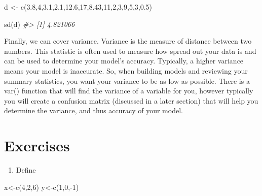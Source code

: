 \documentclass[
]{book}
\newenvironment{Shaded}{\begin{snugshade}}{\end{snugshade}}
\newcommand{\CommentTok}[1]{\textcolor[rgb]{0.56,0.35,0.01}{\textit{#1}}}
\newcommand{\DecValTok}[1]{\textcolor[rgb]{0.00,0.00,0.81}{#1}}
\newcommand{\FloatTok}[1]{\textcolor[rgb]{0.00,0.00,0.81}{#1}}
\newcommand{\FunctionTok}[1]{\textcolor[rgb]{0.00,0.00,0.00}{#1}}
\newcommand{\NormalTok}[1]{#1}
\newcommand{\OtherTok}[1]{\textcolor[rgb]{0.56,0.35,0.01}{#1}}
\newcommand{\SpecialCharTok}[1]{\textcolor[rgb]{0.00,0.00,0.00}{#1}}
\providecommand{\tightlist}{%
  \setlength{\itemsep}{0pt}\setlength{\parskip}{0pt}}
\begin{document}
\begin{Shaded}
\begin{Highlighting}[]
\NormalTok{d }\OtherTok{\textless{}{-}} \FunctionTok{c}\NormalTok{(}\FloatTok{3.8}\NormalTok{,}\DecValTok{4}\NormalTok{,}\FloatTok{3.1}\NormalTok{,}\FloatTok{2.1}\NormalTok{,}\FloatTok{12.6}\NormalTok{,}\DecValTok{17}\NormalTok{,}\FloatTok{8.43}\NormalTok{,}\DecValTok{11}\NormalTok{,}\DecValTok{2}\NormalTok{,}\DecValTok{3}\NormalTok{,}\DecValTok{9}\NormalTok{,}\DecValTok{5}\NormalTok{,}\DecValTok{3}\NormalTok{,}\FloatTok{0.5}\NormalTok{)}

\FunctionTok{sd}\NormalTok{(d)}
\CommentTok{\#\textgreater{} [1] 4.821066}
\end{Highlighting}
\end{Shaded}

Finally, we can cover variance. Variance is the measure of distance between two numbers. This statistic is often used to measure how spread out your data is and can be used to determine your model's accuracy. Typically, a higher variance means your model is inaccurate. So, when building models and reviewing your summary statistics, you want your variance to be as low as possible. There is a var() function that will find the variance of a variable for you, however typically you will create a confusion matrix (discussed in a later section) that will help you determine the variance, and thus accuracy of your model.

\hypertarget{exercises-1}{%
\section{Exercises}\label{exercises-1}}

\begin{enumerate}
\def\labelenumi{\arabic{enumi}.}
\tightlist
\item
  Define
\end{enumerate}

\begin{Shaded}
\begin{Highlighting}[]
\NormalTok{x}\OtherTok{\textless{}{-}}\FunctionTok{c}\NormalTok{(}\DecValTok{4}\NormalTok{,}\DecValTok{2}\NormalTok{,}\DecValTok{6}\NormalTok{)}
\NormalTok{y}\OtherTok{\textless{}{-}}\FunctionTok{c}\NormalTok{(}\DecValTok{1}\NormalTok{,}\DecValTok{0}\NormalTok{,}\SpecialCharTok{{-}}\DecValTok{1}\NormalTok{)}
\end{Highlighting}
\end{Shaded}
\end{document}
